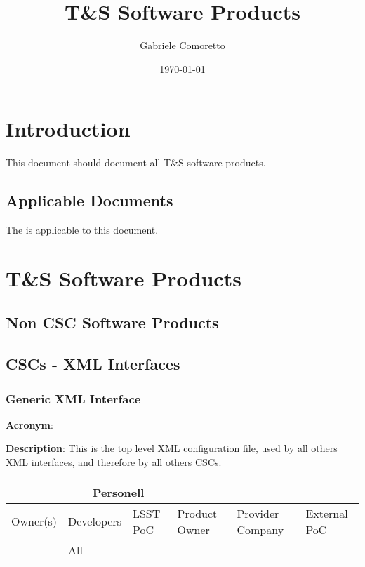 \documentclass[TS,authoryear,toc,lsstdraft]{lsstdoc}
\title{T\&S Software Products}
\author{%
Gabriele Comoretto
}
\date{\today}
\begin{document}
\setDocUpstreamVersion{\vcsrevision}

\maketitle

\section{Introduction}

This document should document all T\&S software products.


\subsection{Applicable Documents}


The  is applicable to this document.


\newpage
\section{T\&S Software Products} \label{sec:tsswp}


\subsection{Non CSC Software Products} \label{sec:nonops}





\subsection{CSCs - XML Interfaces} \label{sec:cscs}


\subsubsection{Generic XML Interface}

\textbf{Acronym}: 

\textbf{Description}:
This is the top level XML configuration file, used by all others XML interfaces, and therefore by all others CSCs.

\begin{longtable}[]{p{2cm}p{2cm}p{2cm}p{2cm}p{2cm}p{2cm}}
\hline
\multicolumn{4}{c}{\textbf{Personell}} \\ \hline
Owner(s)     & Developers & LSST PoC   & Product Owner & Provider Company & External PoC \\ \hline
             & All        &            &               &                  &              \\ \hline
\end{longtable}
\end{document}
